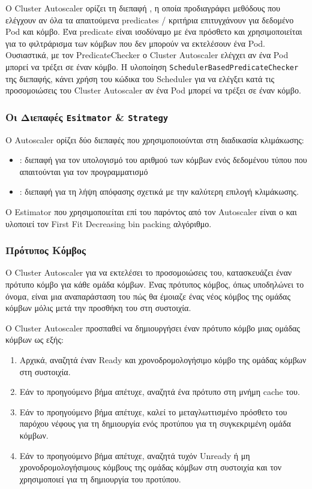 Ο Cluster Autoscaler ορίζει τη διεπαφή , η οποία
προδιαγράφει μεθόδους που ελέγχουν αν όλα τα απαιτούμενα predicates / κριτήρια
επιτυγχάνουν για δεδομένο Pod και κόμβο. Ένα predicate είναι ισοδύναμο με ένα
πρόσθετο  και χρησιμοποιείται για το φιλτράρισμα των κόμβων που δεν
μπορούν να εκτελέσουν ένα Pod. Ουσιαστικά, με τον PredicateChecker ο Cluster
Autoscaler ελέγχει αν ένα Pod μπορεί να τρέξει σε έναν κόμβο. Η υλοποίηση
\texttt{SchedulerBasedPredicateChecker} της διεπαφής, κάνει χρήση του κώδικα του
Scheduler για να ελέγξει κατά τις προσομοιώσεις του Cluster Autoscaler αν ένα
Pod μπορεί να τρέξει σε έναν κόμβο.

\subsubsection{Οι Διεπαφές \texttt{Esitmator} \&  \texttt{Strategy}} Ο Autoscaler ορίζει
δύο διεπαφές που χρησιμοποιούνται στη διαδικασία κλιμάκωσης:
\begin{itemize}
      \tightlist
      \item {}: διεπαφή για τον υπολογισμό του αριθμού των κόμβων
            ενός δεδομένου τύπου που απαιτούνται για τον προγραμματισμό
      \item {}: διεπαφή για τη λήψη απόφασης σχετικά με την καλύτερη
            επιλογή κλιμάκωσης.
\end{itemize}

Ο Estimator που χρησιμοποιείται επί του παρόντος από τον Autoscaler είναι ο
 και υλοποιεί τον First Fit Decreasing bin
packing αλγόριθμο.


\subsubsection{Πρότυπος Κόμβος}
\label{section-gr:design-template}

Ο Cluster Autoscaler  για να εκτελέσει το προσομοιώσεις του, κατασκευάζει έναν
πρότυπο κόμβο για κάθε ομάδα κόμβων. Ένας πρότυπος κόμβος, όπως υποδηλώνει το
όνομα, είναι μια αναπαράσταση του πώς θα έμοιαζε ένας νέος κόμβος της ομάδας
κόμβων μόλις μετά την προσθήκη του στη συστοιχία.

O Cluster Autoscaler προσπαθεί να δημιουργήσει έναν πρότυπο κόμβο μιας ομάδας
κόμβων ως εξής:
\begin{enumerate}
      \tightlist
      \item Αρχικά, αναζητά έναν Ready και χρονοδρομολογήσιμο κόμβο της ομάδας
            κόμβων στη συστοιχία.
      \item Εάν το προηγούμενο βήμα απέτυχε, αναζητά ένα πρότυπο στη μνήμη
            cache του.
      \item Εάν το προηγούμενο βήμα απέτυχε, καλεί το μεταγλωττισμένο πρόσθετο
            του παρόχου νέφους για τη δημιουργία ενός προτύπου για τη
            συγκεκριμένη ομάδα κόμβων.
      \item Εάν το προηγούμενο βήμα απέτυχε, αναζητά  τυχόν Unready ή μη
            χρονοδρομολογήσιμους κόμβους της  ομάδας κόμβων στη συστοιχία και
            τον χρησιμοποιεί για τη δημιουργία του προτύπου.
\end{enumerate}

